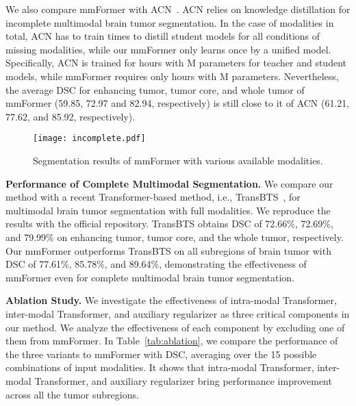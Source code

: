 \documentclass[runningheads]{llncs}
\begin{document}
We also compare mmFormer with ACN~\cite{wang2021acn}. ACN relies on knowledge distillation for incomplete multimodal brain tumor segmentation. In the case of  modalities in total, ACN has to train  times to distill  student models for all conditions of missing modalities, while our mmFormer only learns once by a unified model. Specifically, ACN is trained for  hours with M parameters for  teacher and  student models, while mmFormer requires only  hours with M parameters. Nevertheless, the average DSC for enhancing tumor, tumor core, and whole tumor of mmFormer (59.85, 72.97 and 82.94, respectively) is still close to it of ACN (61.21, 77.62, and 85.92, respectively). 

\begin{figure}[!tp]
\centering
\texttt{[image: incomplete.pdf]}	
\vspace{-6mm}
\caption{Segmentation results of mmFormer with various available modalities.}
\vspace{-4mm}
\label{fig:incomplete}
\end{figure}

\noindent\textbf{Performance of Complete Multimodal Segmentation.}
We compare our method with a recent Transformer-based method, i.e., TransBTS~\cite{wang2021transbts}, for multimodal brain tumor segmentation with full modalities. We reproduce the results with the official repository. TransBTS obtains DSC of 72.66\%, 72.69\%, and 79.99\% on enhancing tumor, tumor core, and the whole tumor, respectively. Our mmFormer outperforms TransBTS on all subregions of brain tumor with DSC of 77.61\%, 85.78\%, and 89.64\%, demonstrating the effectiveness of mmFormer even for complete multimodal brain tumor segmentation.

\noindent\textbf{Ablation Study.}
We investigate the effectiveness of intra-modal Transformer, inter-modal Transformer, and auxiliary regularizer as three critical components in our method. We analyze the effectiveness of each component by excluding one of them from mmFormer. In Table~\ref{tab:ablation}, we compare the performance of the three variants to mmFormer with DSC, averaging over the 15 possible combinations of input modalities. It shows that intra-modal Transformer, inter-modal Transformer, and auxiliary regularizer bring performance improvement across all the tumor subregions.
\end{document}
